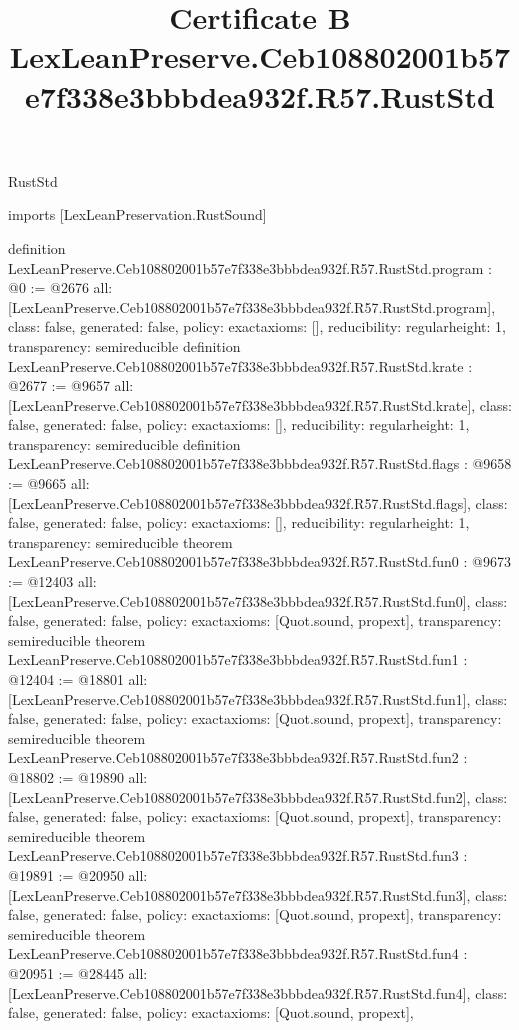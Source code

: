 \begin{lexlean}{RustStd}
\title{Certificate B LexLeanPreserve.Ceb108802001b57e7f338e3bbbdea932f.R57.RustStd}
\begin{coremodule}
imports [LexLeanPreservation.RustSound]

definition LexLeanPreserve.Ceb108802001b57e7f338e3bbbdea932f.R57.RustStd.program : @0 := @2676 {
  all: [LexLeanPreserve.Ceb108802001b57e7f338e3bbbdea932f.R57.RustStd.program],
  class: false,
  generated: false,
  policy: exact{axioms: []},
  reducibility: regular{height: 1},
  transparency: semireducible
}
definition LexLeanPreserve.Ceb108802001b57e7f338e3bbbdea932f.R57.RustStd.krate : @2677 := @9657 {
  all: [LexLeanPreserve.Ceb108802001b57e7f338e3bbbdea932f.R57.RustStd.krate],
  class: false,
  generated: false,
  policy: exact{axioms: []},
  reducibility: regular{height: 1},
  transparency: semireducible
}
definition LexLeanPreserve.Ceb108802001b57e7f338e3bbbdea932f.R57.RustStd.flags : @9658 := @9665 {
  all: [LexLeanPreserve.Ceb108802001b57e7f338e3bbbdea932f.R57.RustStd.flags],
  class: false,
  generated: false,
  policy: exact{axioms: []},
  reducibility: regular{height: 1},
  transparency: semireducible
}
theorem LexLeanPreserve.Ceb108802001b57e7f338e3bbbdea932f.R57.RustStd.fun0 : @9673 := @12403 {
  all: [LexLeanPreserve.Ceb108802001b57e7f338e3bbbdea932f.R57.RustStd.fun0],
  class: false,
  generated: false,
  policy: exact{axioms: [Quot.sound, propext]},
  transparency: semireducible
}
theorem LexLeanPreserve.Ceb108802001b57e7f338e3bbbdea932f.R57.RustStd.fun1 : @12404 := @18801 {
  all: [LexLeanPreserve.Ceb108802001b57e7f338e3bbbdea932f.R57.RustStd.fun1],
  class: false,
  generated: false,
  policy: exact{axioms: [Quot.sound, propext]},
  transparency: semireducible
}
theorem LexLeanPreserve.Ceb108802001b57e7f338e3bbbdea932f.R57.RustStd.fun2 : @18802 := @19890 {
  all: [LexLeanPreserve.Ceb108802001b57e7f338e3bbbdea932f.R57.RustStd.fun2],
  class: false,
  generated: false,
  policy: exact{axioms: [Quot.sound, propext]},
  transparency: semireducible
}
theorem LexLeanPreserve.Ceb108802001b57e7f338e3bbbdea932f.R57.RustStd.fun3 : @19891 := @20950 {
  all: [LexLeanPreserve.Ceb108802001b57e7f338e3bbbdea932f.R57.RustStd.fun3],
  class: false,
  generated: false,
  policy: exact{axioms: [Quot.sound, propext]},
  transparency: semireducible
}
theorem LexLeanPreserve.Ceb108802001b57e7f338e3bbbdea932f.R57.RustStd.fun4 : @20951 := @28445 {
  all: [LexLeanPreserve.Ceb108802001b57e7f338e3bbbdea932f.R57.RustStd.fun4],
  class: false,
  generated: false,
  policy: exact{axioms: [Quot.sound, propext]},
}
\end{coremodule}
\end{lexlean}
